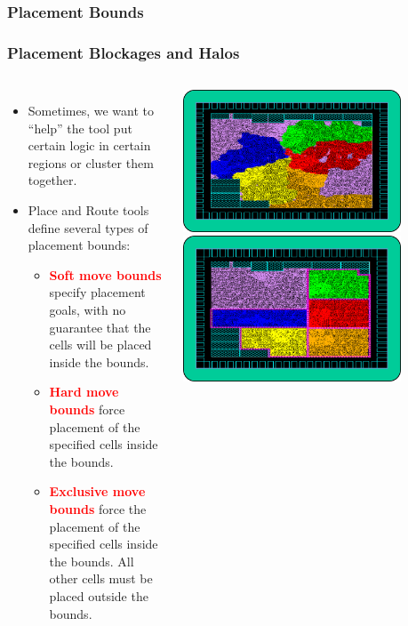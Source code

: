 \documentclass[compress]{beamer}
\begin{document}
\begin{frame}
	\frametitle{Placement Bounds}
	\frametitle{Placement Blockages and Halos}
	\begin{columns}	
		\begin{itemize}
			\item Sometimes, we want to “help” the tool put certain
			logic in certain regions or cluster them together.
			\item Place and Route tools define several types of placement bounds:
			\begin{itemize}
				\item \textcolor{red}{\textbf{Soft move bounds}} specify placement goals, with no guarantee that the cells will be placed inside the    bounds.
				\item \textcolor{red}{\textbf{Hard move bounds}} force placement of the specified cells inside the bounds.
				\item \textcolor{red}{\textbf{Exclusive move bounds}} force the placement of the specified cells inside the bounds. All other cells must be placed outside the bounds.
			\end{itemize}
		\end{itemize}
		\begin{center}
			\includegraphics[width= 0.8\textwidth]{before}\qquad
			\includegraphics[width=0.8\textwidth]{after}
		\end{center}
	\end{columns}
\end{frame}
\end{document}
